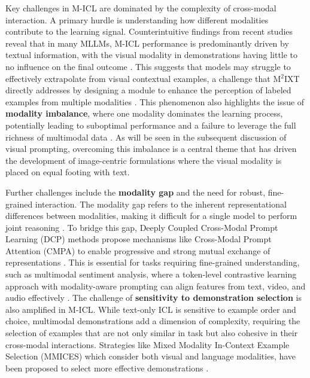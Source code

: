 \documentclass[11pt]{article}
\begin{document}
Key challenges in M-ICL are dominated by the complexity of cross-modal interaction. A primary hurdle is understanding how different modalities contribute to the learning signal. Counterintuitive findings from recent studies reveal that in many MLLMs, M-ICL performance is predominantly driven by textual information, with the visual modality in demonstrations having little to no influence on the final outcome \cite{ref220,ref221}. This suggests that models may struggle to effectively extrapolate from visual contextual examples, a challenge that M\(^2\)IXT directly addresses by designing a module to enhance the perception of labeled examples from multiple modalities \cite{ref218}. This phenomenon also highlights the issue of \textbf{modality imbalance}, where one modality dominates the learning process, potentially leading to suboptimal performance and a failure to leverage the full richness of multimodal data \cite{ref222}. As will be seen in the subsequent discussion of visual prompting, overcoming this imbalance is a central theme that has driven the development of image-centric formulations where the visual modality is placed on equal footing with text.

Further challenges include the \textbf{modality gap} and the need for robust, fine-grained interaction. The modality gap refers to the inherent representational differences between modalities, making it difficult for a single model to perform joint reasoning \cite{ref223}. To bridge this gap, Deeply Coupled Cross-Modal Prompt Learning (DCP) methods propose mechanisms like Cross-Modal Prompt Attention (CMPA) to enable progressive and strong mutual exchange of representations \cite{ref224}. This is essential for tasks requiring fine-grained understanding, such as multimodal sentiment analysis, where a token-level contrastive learning approach with modality-aware prompting can align features from text, video, and audio effectively \cite{ref225}. The challenge of \textbf{sensitivity to demonstration selection} is also amplified in M-ICL. While text-only ICL is sensitive to example order and choice, multimodal demonstrations add a dimension of complexity, requiring the selection of examples that are not only similar in task but also cohesive in their cross-modal interactions. Strategies like Mixed Modality In-Context Example Selection (MMICES) which consider both visual and language modalities, have been proposed to select more effective demonstrations \cite{ref221}.
\end{document}
